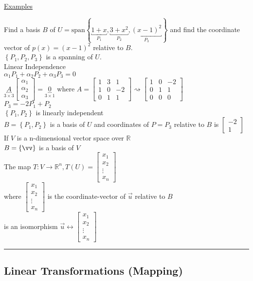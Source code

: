 \documentclass[12pt]{article}
\renewcommand{\v}[1]{\overrightarrow{#1}}
\newcommand\m[1]{\begin{bmatrix}#1\end{bmatrix}}
\newcommand{\real}[0]{\mathbb{R}}
\newenvironment{remark}{\block[Remark]}{\endblock}
\newcommand{\uu}[1]{\underbracket{#1}}
\newenvironment{examples}{\shownto{-,compact}\underline{Examples}\enumerate}{\endenumerate\divider\endshownto}
\newcommand{\bb}[1]{\left\{#1\right\}}
\newcommand{\divider}[0]{\par\textcolor{lightgray}{\rule{\textwidth}{0.1pt}}}
\newcommand{\sspan}[1]{\text{span}\bb{#1}}
\begin{document}
\begin{examples}
		\item Find a basis $B$ of $U = \sspan{\uu{1 + x}_{P_1}, \uu{3 + x^2}_{P_2}, \uu{(x - 1)^2}_{P_3}}$ and find the coordinate vector of $p(x) = (x - 1)^2$ relative to $B$. \\
		$\bb{P_1, P_2, P_3}$ is a spanning of $U$. \\
		Linear Independence \\
		$\alpha_1 P_1 + \alpha_2 P_2 + \alpha_3 P_3 = 0$ \\
		$\uu{A}_{3 \times 3} \m{\alpha_1 \\ \alpha_2 \\ \alpha_3} = \uu{0}_{3 \times 1}$ where $A = \m{1 & 3 & 1 \\ 1 & 0 & -2 \\ 0 & 1 & 1} \rightsquigarrow \m{1 & 0 & -2 \\ 0 & 1 & 1 \\ 0 & 0 & 0}$ \\
		$P_3 = -2 P_1 + P_2$ \\
		$\bb{P_1, P_2}$ is linearly independent \\
		$B = \bb{P_1, P_2}$ is a basis of $U$ and coordinates of $P = P_3$ relative to $B$ is $\m{-2 \\ 1}$ \\
		\begin{remark}
			If $V$ is a n-dimensional vector space over $\real$ \\
			$B = \bb{\vv}$ is a basis of $V$ \\
			The map $T: V \rightarrow \real^n, T(U) = \m{x_1 \\ x_2 \\ \vdots \\ x_n}$ \\
			where $\m{x_1 \\ x_2 \\ \vdots \\ x_n}$ is the coordinate-vector of $\v{u}$ relative to $B$ \\
			is an isomorphism $\v{u} \leftrightarrow \m{x_1 \\ x_2 \\ \vdots \\ x_n}$
		\end{remark}
	\end{examples}
	
	\subsection{Linear Transformations (Mapping)}
	
\end{document}
